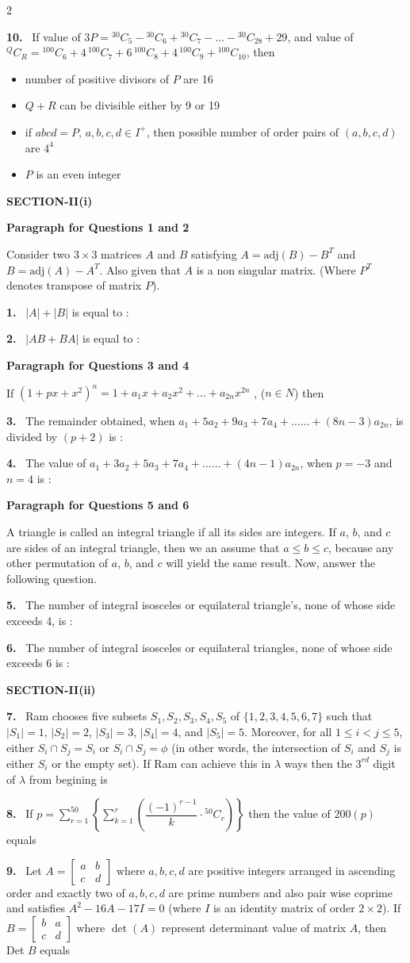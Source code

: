 \documentclass[10pt]{extarticle}
\newcommand{\sect}[1]{\par\smallskip\noindent\textbf{#1}\par}
\newcommand{\qn}[1]{\par\smallskip\noindent\textbf{#1.}~}
\newcommand{\paraq}[2]{\par\smallskip\noindent\textbf{Paragraph for Questions #1 and #2}\par}
\newenvironment{qoptions}{\begin{itemize}[leftmargin=1.8em,itemsep=1pt,topsep=2pt,label={}]}{\end{itemize}}
\newcommand{\opt}[2]{\item[(#1)] #2}
\begin{document}
\begin{multicols}{2}
\qn{10} If value of $3P={}^{30}C_5-{}^{30}C_6+{}^{30}C_7-\ldots-{}^{30}C_{28}+29$, and value of ${}^QC_R={}^{100}C_6+4\,{}^{100}C_7+6\,{}^{100}C_8+4\,{}^{100}C_9+{}^{100}C_{10}$, then
\begin{qoptions}
\opt{A}{number of positive divisors of $P$ are 16}
\opt{B}{$Q+R$ can be divisible either by 9 or 19}
\opt{C}{if $abcd=P$, $a,b,c,d\in I^+$, then possible number of order pairs of $(a,b,c,d)$ are $4^4$}
\opt{D}{$P$ is an even integer}
\end{qoptions}
\sect{SECTION-II(i)}
\paraq{1}{2}
Consider two $3\times3$ matrices $A$ and $B$ satisfying $A=\text{adj}(B)-B^T$ and $B=\text{adj}(A)-A^T$. Also given that $A$ is a non singular matrix. (Where $P^T$ denotes transpose of matrix $P$).
\qn{1} $|A|+|B|$ is equal to :
\qn{2} $|AB+BA|$ is equal to :
\paraq{3}{4}
If $(1+px+x^2)^n=1+a_1x+a_2x^2+\ldots+a_{2n}x^{2n}$ , ($n\in N$) then
\qn{3} The remainder obtained, when $a_1+5a_2+9a_3+7a_4+\ldots\ldots+(8n-3)a_{2n}$, is divided by $(p+2)$ is :
\qn{4} The value of $a_1+3a_2+5a_3+7a_4+\ldots\ldots+(4n-1)a_{2n}$, when $p=-3$ and $n=4$ is :
\paraq{5}{6}
A triangle is called an integral triangle if all its sides are integers. If $a$, $b$, and $c$ are sides of an integral triangle, then we an assume that $a\le b\le c$, because any other permutation of $a$, $b$, and $c$ will yield the same result. Now, answer the following question.
\qn{5} The number of integral isosceles or equilateral triangle's, none of whose side exceeds 4, is :
\qn{6} The number of integral isosceles or equilateral triangles, none of whose side exceeds 6 is :
\sect{SECTION-II(ii)}
\qn{7} Ram chooses five subsets $S_1,S_2,S_3,S_4,S_5$ of $\{1,2,3,4,5,6,7\}$ such that $|S_1|=1$, $|S_2|=2$, $|S_3|=3$, $|S_4|=4$, and $|S_5|=5$. Moreover, for all $1\le i<j\le5$, either $S_i\cap S_j=S_i$ or $S_i\cap S_j=\phi$ (in other words, the intersection of $S_i$ and $S_j$ is either $S_i$ or the empty set). If Ram can achieve this in $\lambda$ ways then the $3^{rd}$ digit of $\lambda$ from begining is \underline{\hspace{1.5cm}}
\qn{8} If $p=\displaystyle\sum_{r=1}^{50}\left\{\sum_{k=1}^{r}\left(\dfrac{(-1)^{r-1}}{k}\cdot{}^{50}C_r\right)\right\}$ then the value of $200(p)$ equals
\qn{9} Let $A=\begin{bmatrix}a&b\\c&d\end{bmatrix}$ where $a,b,c,d$ are positive integers arranged in ascending order and exactly two of $a,b,c,d$ are prime numbers and also pair wise coprime and satisfies $A^2-16A-17I=0$ (where $I$ is an identity matrix of order $2\times2$). If $B=\begin{bmatrix}b&a\\c&d\end{bmatrix}$ where $\det(A)$ represent determinant value of matrix $A$, then Det $B$ equals

\end{multicols}
\end{document}
